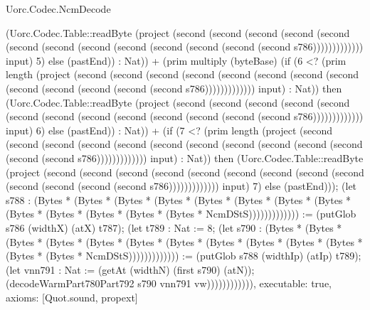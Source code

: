 \begin{lexlean}{Uorc.Codec.NcmDecode}
\begin{semanticmodule}
{(Uorc.Codec.Table::readByte (project (second (second (second (second (second (second (second (second (second (second (second (second (second s786))))))))))))) input) 5) else (pastEnd)) : Nat)) + (prim multiply (byteBase) (if (6 <? (prim length (project (second (second (second (second (second (second (second (second (second (second (second (second (second s786))))))))))))) input) : Nat)) then (Uorc.Codec.Table::readByte (project (second (second (second (second (second (second (second (second (second (second (second (second (second s786))))))))))))) input) 6) else (pastEnd)) : Nat)) + (if (7 <? (prim length (project (second (second (second (second (second (second (second (second (second (second (second (second (second s786))))))))))))) input) : Nat)) then (Uorc.Codec.Table::readByte (project (second (second (second (second (second (second (second (second (second (second (second (second (second s786))))))))))))) input) 7) else (pastEnd))); (let s788 : (Bytes * (Bytes * (Bytes * (Bytes * (Bytes * (Bytes * (Bytes * (Bytes * (Bytes * (Bytes * (Bytes * (Bytes * (Bytes * NcmDStS))))))))))))) := (putGlob s786 (widthX) (atX) t787); (let t789 : Nat := 8; (let s790 : (Bytes * (Bytes * (Bytes * (Bytes * (Bytes * (Bytes * (Bytes * (Bytes * (Bytes * (Bytes * (Bytes * (Bytes * (Bytes * NcmDStS))))))))))))) := (putGlob s788 (widthIp) (atIp) t789); (let vnn791 : Nat := (getAt (widthN) (first s790) (atN)); (decodeWarmPart780Part792 s790 vnn791 vw)))))))))))),
  executable: true,
  axioms: [Quot.sound, propext]
}


\end{semanticmodule}
\end{lexlean}
